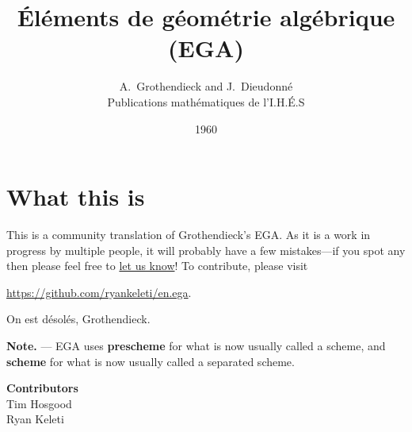 \documentclass[10pt,oneside]{book}
\begin{document}
\title{\'El\'ements de g\'eom\'etrie alg\'ebrique\\
(EGA)}
\author{A.~Grothendieck and J.~Dieudonn\'e\\
Publications math\'ematiques de l'I.H.\'E.S}
\date{1960}
\maketitle
\frontmatter
\chapter*{What this is}
\label{chapter-what-this-is}
    This is a community translation of Grothendieck's EGA.
    As it is a work in progress by multiple people, it will probably have a few
    mistakes---if you spot any then please feel free to
    \href{https://github.com/ryankeleti/en.ega/issues}{let us know}! To
    contribute, please visit
    \begin{center}
      \url{https://github.com/ryankeleti/en.ega}.
    \end{center}
    On est d\'esol\'es, Grothendieck.

\noindent
    \textbf{Note.} --- EGA uses \textbf{prescheme} for what is now usually
    called a scheme, and \textbf{scheme} for what is now usually called a
    separated scheme.
    \begin{center}
      \textbf{Contributors}\\
      Tim Hosgood\\
      Ryan Keleti
    \end{center}
{
  \tableofcontents{}
}
\clearpage
\mainmatter



\clearpage



\clearpage



\clearpage


\end{document}
